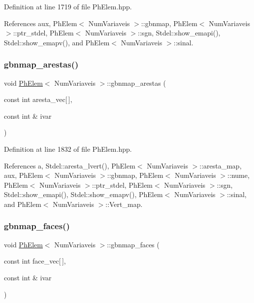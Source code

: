 Definition at line 1719 of file Ph\+Elem.\+hpp.



References aux, Ph\+Elem$<$ Num\+Variaveis $>$\+::gbnmap, Ph\+Elem$<$ Num\+Variaveis $>$\+::ptr\+\_\+stdel, Ph\+Elem$<$ Num\+Variaveis $>$\+::sgn, Stdel\+::show\+\_\+emapi(), Stdel\+::show\+\_\+emapv(), and Ph\+Elem$<$ Num\+Variaveis $>$\+::sinal.

\mbox{\label{classPhElem_af545eccd164b2fc7ca104afff13a50c6}} 
\subsubsection{\texorpdfstring{gbnmap\+\_\+arestas()}{gbnmap\_arestas()}}
{\footnotesize\ttfamily void \hyperlink{classPhElem}{Ph\+Elem}$<$ Num\+Variaveis $>$\+::gbnmap\+\_\+arestas (\begin{DoxyParamCaption}\item[{const int}]{aresta\+\_\+vec\mbox{[}$\,$\mbox{]},  }\item[{const int \&}]{ivar }\end{DoxyParamCaption})\hspace{0.3cm}{\ttfamily [inherited]}}



Definition at line 1832 of file Ph\+Elem.\+hpp.



References a, Stdel\+::aresta\+\_\+lvert(), Ph\+Elem$<$ Num\+Variaveis $>$\+::aresta\+\_\+map, aux, Ph\+Elem$<$ Num\+Variaveis $>$\+::gbnmap, Ph\+Elem$<$ Num\+Variaveis $>$\+::nume, Ph\+Elem$<$ Num\+Variaveis $>$\+::ptr\+\_\+stdel, Ph\+Elem$<$ Num\+Variaveis $>$\+::sgn, Stdel\+::show\+\_\+emapi(), Stdel\+::show\+\_\+emapv(), Ph\+Elem$<$ Num\+Variaveis $>$\+::sinal, and Ph\+Elem$<$ Num\+Variaveis $>$\+::\+Vert\+\_\+map.

\mbox{\label{classPhElem_ad355231f4e2807541c62212647c44b3e}} 
\subsubsection{\texorpdfstring{gbnmap\+\_\+faces()}{gbnmap\_faces()}}
{\footnotesize\ttfamily void \hyperlink{classPhElem}{Ph\+Elem}$<$ Num\+Variaveis $>$\+::gbnmap\+\_\+faces (\begin{DoxyParamCaption}\item[{const int}]{face\+\_\+vec\mbox{[}$\,$\mbox{]},  }\item[{const int \&}]{ivar }\end{DoxyParamCaption})\hspace{0.3cm}{\ttfamily [inherited]}}



